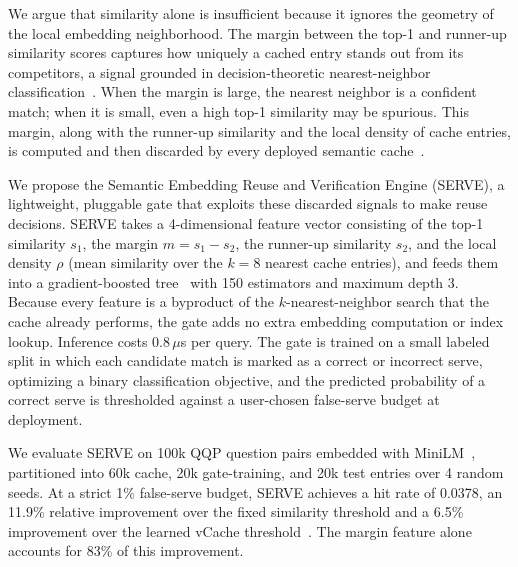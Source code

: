 We argue that similarity alone is insufficient because it ignores the geometry of the local embedding neighborhood. The margin between the top-1 and runner-up similarity scores captures how uniquely a cached entry stands out from its competitors, a signal grounded in decision-theoretic nearest-neighbor classification~\cite{chow1970reject}. When the margin is large, the nearest neighbor is a confident match; when it is small, even a high top-1 similarity may be spurious. This margin, along with the runner-up similarity and the local density of cache entries, is computed and then discarded by every deployed semantic cache~\cite{bang2023gptcache,gill2025meancache,schroeder2026vcache}.

We propose the Semantic Embedding Reuse and Verification Engine (SERVE), a lightweight, pluggable gate that exploits these discarded signals to make reuse decisions. SERVE takes a 4-dimensional feature vector consisting of the top-1 similarity \(s_1\), the margin \(m = s_1 - s_2\), the runner-up similarity \(s_2\), and the local density \(\rho\) (mean similarity over the \(k=8\) nearest cache entries), and feeds them into a gradient-boosted tree~\cite{friedman2001greedy} with 150 estimators and maximum depth 3.
Because every feature is a byproduct of the \(k\)-nearest-neighbor search that the cache already performs, the gate adds no extra embedding computation or index lookup.
Inference costs 0.8\,\(\mu\)s per query.
The gate is trained on a small labeled split in which each candidate match is marked as a correct or incorrect serve, optimizing a binary classification objective, and the predicted probability of a correct serve is thresholded against a user-chosen false-serve budget at deployment.

We evaluate SERVE on 100k QQP question pairs embedded with MiniLM~\cite{wang2020minilm}, partitioned into 60k cache, 20k gate-training, and 20k test entries over 4 random seeds.
At a strict 1\% false-serve budget, SERVE achieves a hit rate of 0.0378, an 11.9\% relative improvement over the fixed similarity threshold and a 6.5\% improvement over the learned vCache threshold~\cite{schroeder2026vcache}.
The margin feature alone accounts for 83\% of this improvement.

